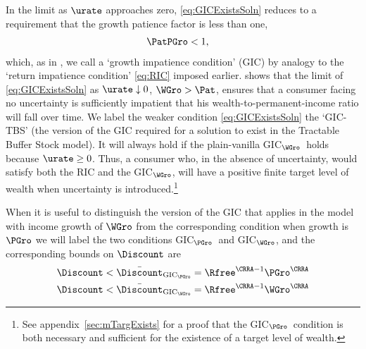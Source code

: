 \documentclass{\handout}
\begin{document}
\providecommand{\GICPGro}{GIC$_{\PGro}$}
\providecommand{\GICWGro}{GIC$_{\WGro}$}
In the limit as $\urate$ approaches zero, \eqref{eq:GICExistsSoln} reduces to a requirement that the growth patience factor is less than one,
\begin{equation}\begin{gathered}\begin{aligned}
  \PatPGro & <  1 \label{eq:GICPGro}
,\end{aligned}\end{gathered}\end{equation}
which, as in ,  we call a `growth impatience condition' (GIC) by analogy to the `return impatience condition' \eqref{eq:RIC} imposed earlier.   shows that the limit of \eqref{eq:GICExistsSoln} as $\urate \downarrow 0$, $\WGro > \Pat$, ensures that a consumer facing no uncertainty is sufficiently impatient that his wealth-to-permanent-income ratio will fall over time.  
We label the weaker condition \eqref{eq:GICExistsSoln} the `GIC-TBS' (the version of the GIC required for a solution to exist in the Tractable Buffer Stock model).  It will always hold if the plain-vanilla \GICWGro~holds because $\urate \geq 0$.  Thus, a consumer who, in the absence of uncertainty, would satisfy both the RIC and the \GICWGro, will have a positive finite target level of wealth when uncertainty is introduced.\footnote{See appendix~\ref{sec:mTargExists} for a proof that the \GICPGro~condition is both necessary and sufficient for the existence of a target level of wealth.}

When it is useful to distinguish the version of the GIC that applies in the model with income growth of $\WGro$ from the corresponding condition when growth is $\PGro$ we will label the two conditions \GICPGro~and \GICWGro, and the corresponding bounds on $\Discount$ are 
\providecommand{\DiscountMaxGICPGro}{\bar{\Discount}_{\text{GIC}_\PGro}}
\providecommand{\DiscountMaxGICWGro}{\bar{\Discount}_{\text{GIC}_\WGro}}
\begin{equation}\begin{gathered}\begin{aligned}
   \Discount < \DiscountMaxGICPGro & =  \Rfree^{\CRRA-1}\PGro^{\CRRA}
\\ \Discount < \DiscountMaxGICWGro & =  \Rfree^{\CRRA-1}\WGro^{\CRRA}
\end{aligned}\end{gathered}\end{equation}
\end{document}
